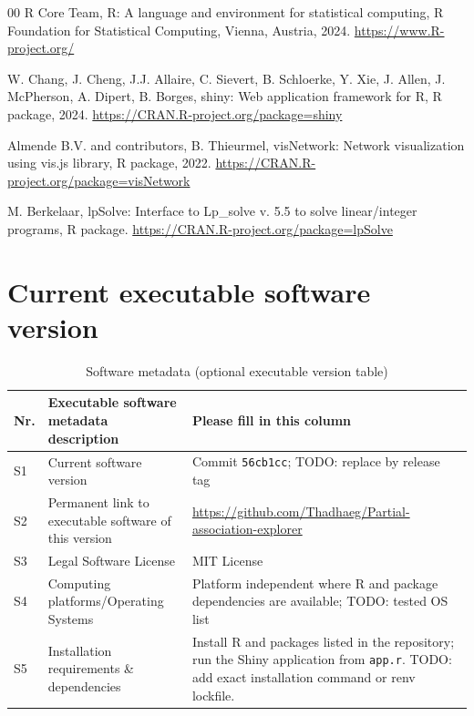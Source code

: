\documentclass[preprint,12pt,a4paper]{elsarticle}
\begin{document}
\begin{thebibliography}{00}
R Core Team, R: A language and environment for statistical computing, R Foundation for Statistical Computing, Vienna, Austria, 2024. \url{https://www.R-project.org/}

W. Chang, J. Cheng, J.J. Allaire, C. Sievert, B. Schloerke, Y. Xie, J. Allen, J. McPherson, A. Dipert, B. Borges, shiny: Web application framework for R, R package, 2024. \url{https://CRAN.R-project.org/package=shiny}

Almende B.V. and contributors, B. Thieurmel, visNetwork: Network visualization using vis.js library, R package, 2022. \url{https://CRAN.R-project.org/package=visNetwork}

M. Berkelaar, lpSolve: Interface to Lp\_solve v. 5.5 to solve linear/integer programs, R package. \url{https://CRAN.R-project.org/package=lpSolve}

\end{thebibliography}

\section*{Current executable software version}

\begin{table}[!h]
\begin{tabular}{|l|p{6.5cm}|p{6.5cm}|}
\hline
\textbf{Nr.} & \textbf{Executable software metadata description} & \textbf{Please fill in this column} \\
\hline
S1 & Current software version & Commit \texttt{56cb1cc}; TODO: replace by release tag \\
\hline
S2 & Permanent link to executable software of this version & \url{https://github.com/Thadhaeg/Partial-association-explorer} \\
\hline
S3 & Legal Software License & MIT License \\
\hline
S4 & Computing platforms/Operating Systems & Platform independent where R and package dependencies are available; TODO: tested OS list \\
\hline
S5 & Installation requirements \& dependencies & Install R and packages listed in the repository; run the Shiny application from \texttt{app.r}. TODO: add exact installation command or renv lockfile. \\
\hline
\end{tabular}
\caption{Software metadata (optional executable version table)}
\label{tab:software-metadata}
\end{table}
\end{document}
